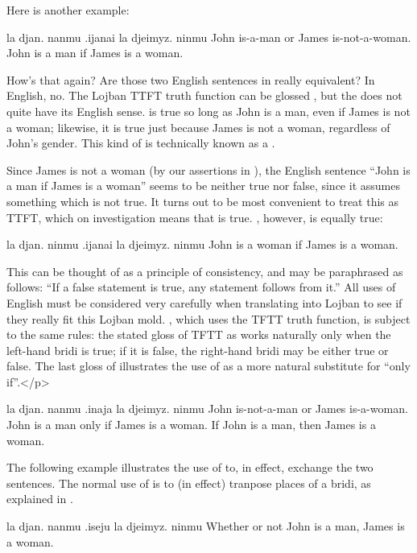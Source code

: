 Here is another example:
\begin{example}
la djan. nanmu .ijanai la djeimyz. ninmu\n
John is-a-man or James is-not-a-woman.\n
John is a man if James is a woman.
\end{example}

How's that again? Are those two English sentences in  really equivalent? In English, no.
    The Lojban TTFT truth function can be glossed , but
    the  does not quite have its English sense.  is true so long as John is a man,
    even if James is not a woman; likewise, it is true just because
    James is not a woman, regardless of John's gender. This kind of
     is technically known as a .

Since James is not a woman (by our assertions in ), the English sentence ``John is a man
    if James is a woman'' seems to be neither true nor false, since
    it assumes something which is not true. It turns out to be most
    convenient to treat this  as TTFT, which on investigation
    means that  is true. , however, is equally true:
\begin{example}
la djan. ninmu .ijanai la djeimyz. ninmu\n
John is a woman if James is a woman.
\end{example}

This can be thought of as a principle of consistency, and may
    be paraphrased as follows: ``If a false statement is true, any
    statement follows from it.'' All uses of English  must be
    considered very carefully when translating into Lojban to see
    if they really fit this Lojban mold. 
, which uses the TFTT truth
    function, is subject to the same rules: the stated gloss of TFTT as
     works naturally only when the left-hand bridi is true;
    if it is false, the right-hand bridi may be either true or false.
    The last gloss of  illustrates the
    use of  as a more natural substitute for ``only
    if''.</p>
\begin{example}
la djan. nanmu .inaja la djeimyz. ninmu\n
John is-not-a-man or James is-a-woman.\n
John is a man only if James is a woman.\n
If John is a man, then James is a woman.
\end{example}

The following example illustrates the use of  to, in
    effect, exchange the two sentences. The normal use of  is
    to (in effect) tranpose places of a bridi, as explained in .
\begin{example}
la djan. nanmu .iseju la djeimyz. ninmu\n
Whether or not John is a man, James is a woman.
\end{example}

